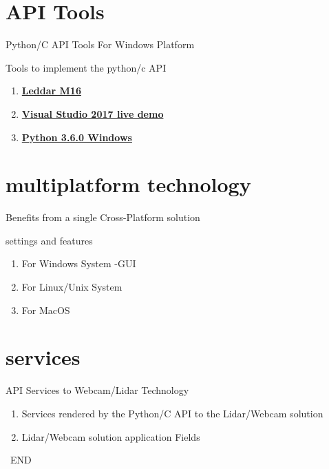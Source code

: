\documentclass[10pt]{beamer}
\begin{document}
\section{API Tools}
\begin{frame}[t]{ Python/C API  Tools  For Windows Platform}\vspace{.5 in}

\begin{block}{Tools  to implement the python/c API}
\begin{enumerate}
\item \hyperlink{https://support.leddartech.com/downloads/files/91-leddarinstaller-exe}{ \textbf{Leddar M16}}
\item \hyperlink{https://www.visualstudio.com/thank-you-downloading-visual-studio-imagine/?sku=Enterprise&rel=15 }{\textbf{Visual Studio 2017 live demo} }
\item \hyperlink{https://www.python.org/downloads/windows/}{\textbf{Python 3.6.0 Windows}}
\end{enumerate}
\end{block}
\end{frame}

\section{multiplatform technology}
\begin{frame}[t]{Benefits from a single Cross-Platform solution}\vspace{.5 in}
\begin{block}{settings and features}
\begin{enumerate}
\item For Windows System -GUI
\item For Linux/Unix System
\item For MacOS
\end{enumerate}
\end{block} 
\end{frame}

\section{services}
\begin{frame}[t]{API Services to Webcam/Lidar Technology}\vspace{.5 in}
\begin{enumerate}
\item Services rendered by the Python/C API to the Lidar/Webcam solution  
\item Lidar/Webcam solution application Fields 
 \end{enumerate}
\huge\centering\ END 
\end{frame}
\end{document}
